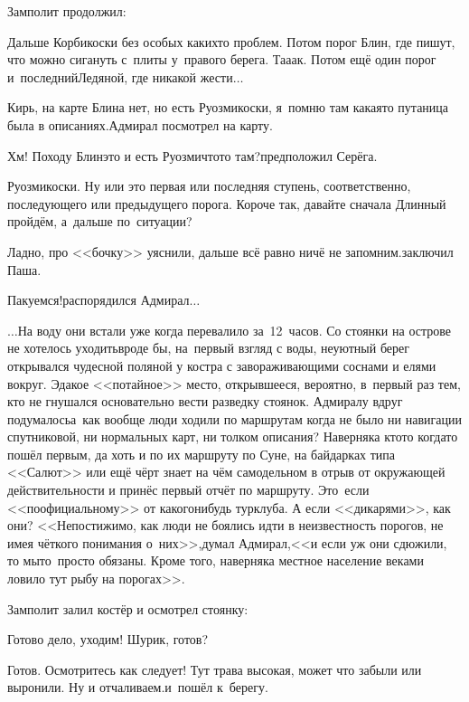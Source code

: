 Замполит продолжил:

\diagdash Дальше Корбикоски без особых каких\sdash то проблем. Потом порог Блин, где пишут, что можно сигануть с~плиты у~правого берега. Та\sdash а\sdash ак. Потом ещё один порог и~последний\mdash Ледяной, где никакой жести$\ldots$

\diagdash Кирь, на карте Блина нет, но есть Руозмикоски, я~помню там какая\sdash то путаница была в описаниях.\mdash Адмирал посмотрел на карту.

\diagdash Хм! Походу Блин\mdash это и есть Руозми\sdash что\sdash то там?\diagdash предположил Серёга.

\diagdash Руозмикоски. Ну или это первая или последняя ступень, соответственно, последующего или предыдущего порога. Короче так, давайте сначала Длинный пройдём, а~дальше по~ситуации?

\diagdash Ладно, про <<бочку>> уяснили, дальше всё равно ничё не запомним.\mdash заключил Паша.

\diagdash Пакуемся!\mdash распорядился Адмирал$\ldots$

\vspace{0.5cm}
$\ldots$На воду они встали уже когда перевалило за~12~часов. Со стоянки на острове не хотелось уходить\mdash вроде бы, на~первый взгляд с воды, неуютный берег открывался чудесной поляной у костра с завораживающими соснами и елями вокруг. Эдакое <<потайное>> место, открывшееся, вероятно, в~первый раз тем, кто не гнушался основательно вести разведку стоянок. Адмиралу вдруг подумалось\mdash а~как вообще люди ходили по маршрутам когда не было ни навигации спутниковой, ни нормальных карт, ни толком описания? Наверняка кто\sdash то когда\sdash то пошёл первым, да хоть и по их маршруту по Суне, на байдарках типа <<Салют>> или ещё чёрт знает на чём самодельном в отрыв от окружающей действительности и принёс первый отчёт по маршруту. Это~если <<по\sdash официальному>> от какого\sdash нибудь турклуба. А если <<дикарями>>, как они? <<Непостижимо, как люди не боялись идти в неизвестность порогов, не имея чёткого понимания о~них>>,\mdash думал Адмирал,\mdash <<и если уж они сдюжили, то мы\sdash то~просто обязаны. Кроме того, наверняка местное население веками ловило тут рыбу на порогах>>.

Замполит залил костёр и осмотрел стоянку:

\diagdash Готово дело, уходим! Шурик, готов?

\diagdash Готов. Осмотритесь как следует! Тут трава высокая, может что забыли или выронили. Ну и отчаливаем.\mdash и~пошёл к~берегу.

